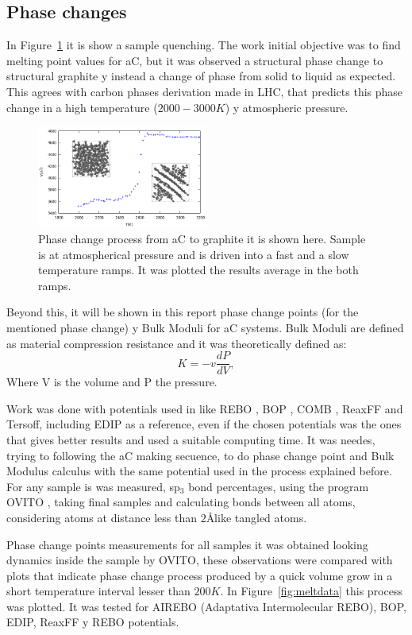 \documentclass[a4paper,fleqn]{cas-dc}
\begin{document}
\subsection{Phase changes}
 In Figure~\ref{fig:meltproc} it is show a sample quenching. The work initial objective was to find melting point values for aC, but it was observed a structural phase change to structural graphite y instead a change of phase from solid to liquid as expected. This agrees with carbon phases derivation made in LHC, that predicts this phase change in a high temperature ($2000- 3000K$) y atmospheric pressure.\cite{Zazula}  
 \begin{figure}
    \includegraphics[width=0.5\textwidth]{melting.png}
    \caption{Phase change process from aC to graphite it is shown here. Sample is at atmospherical pressure and is driven into a fast and a slow temperature ramps. It was plotted the results average in the both ramps.}
      \label{fig:meltproc}
\end{figure}
 Beyond this, it will be shown in this report phase change points (for the mentioned phase change) y Bulk Moduli for aC systems. Bulk Moduli are defined as material compression resistance and it was theoretically defined as:
 \begin{equation} K=-v\frac{dP}{dV}, \end{equation} Where V is the volume and P the pressure. 
 
 Work was done with potentials used in \cite{ACPot1} like REBO , BOP , COMB , ReaxFF and Tersoff, including EDIP as a reference, even if the chosen potentials was the ones that gives better results and used a suitable computing time. It was needes, trying to following the aC making secuence, to do phase change point and Bulk Modulus calculus with the same potential used in the process explained before. For any sample is was measured, sp$_3$ bond percentages, using the program OVITO  \cite{Ovito}, taking  final samples and calculating bonds between all atoms, considering atoms at distance less than $2$\AA \space like tangled atoms. 

Phase change points measurements for all samples it was obtained looking dynamics inside the sample by OVITO, these observations were compared with plots that indicate phase change process produced by a quick volume grow in a short temperature interval lesser than $200K$. In Figure~\ref{fig:meltdata} this process was plotted. It was tested for  AIREBO (Adaptativa Intermolecular REBO), BOP, EDIP, ReaxFF y REBO potentials. 
\end{document}
